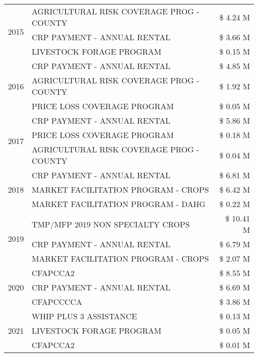 \begin{tabular}{llr}
\cline{1-3}
\multirow[t]{3}{*}{2015} & AGRICULTURAL RISK COVERAGE PROG - COUNTY & \$ 4.24 M \\
 & CRP PAYMENT - ANNUAL RENTAL & \$ 3.66 M \\
 & LIVESTOCK FORAGE PROGRAM & \$ 0.15 M \\
\cline{1-3}
\multirow[t]{3}{*}{2016} & CRP PAYMENT - ANNUAL RENTAL & \$ 4.85 M \\
 & AGRICULTURAL RISK COVERAGE PROG - COUNTY & \$ 1.92 M \\
 & PRICE LOSS COVERAGE PROGRAM & \$ 0.05 M \\
\cline{1-3}
\multirow[t]{3}{*}{2017} & CRP PAYMENT - ANNUAL RENTAL & \$ 5.86 M \\
 & PRICE LOSS COVERAGE PROGRAM & \$ 0.18 M \\
 & AGRICULTURAL RISK COVERAGE PROG - COUNTY & \$ 0.04 M \\
\cline{1-3}
\multirow[t]{3}{*}{2018} & CRP PAYMENT - ANNUAL RENTAL & \$ 6.81 M \\
 & MARKET FACILITATION PROGRAM - CROPS & \$ 6.42 M \\
 & MARKET FACILITATION PROGRAM - DAHG & \$ 0.22 M \\
\cline{1-3}
\multirow[t]{3}{*}{2019} & TMP/MFP 2019 NON SPECIALTY CROPS & \$ 10.41 M \\
 & CRP PAYMENT - ANNUAL RENTAL & \$ 6.79 M \\
 & MARKET FACILITATION PROGRAM - CROPS & \$ 2.07 M \\
\cline{1-3}
\multirow[t]{3}{*}{2020} & CFAPCCA2 & \$ 8.55 M \\
 & CRP PAYMENT - ANNUAL RENTAL & \$ 6.69 M \\
 & CFAPCCCCA & \$ 3.86 M \\
\cline{1-3}
\multirow[t]{3}{*}{2021} & WHIP PLUS 3 ASSISTANCE & \$ 0.13 M \\
 & LIVESTOCK FORAGE PROGRAM & \$ 0.05 M \\
 & CFAPCCA2 & \$ 0.01 M \\
\cline{1-3}
\bottomrule
\end{tabular}
